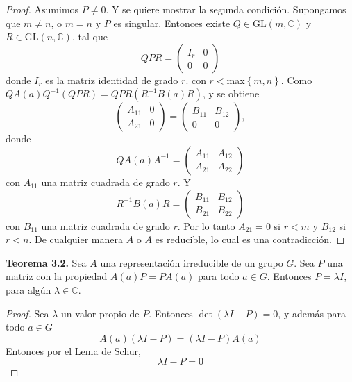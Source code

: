 \documentclass[12pt]{book}
\theoremstyle{definition}
\newcounter{in}
\begin{document}
\begin{proof}
Asumimos $P \neq 0$. Y se quiere mostrar la segunda
condición. Supongamos que $m \neq n$, o $m=n$ y $P$ es
singular. Entonces existe $Q \in \mathrm{GL}(m,\mathbb{C})$ y
$R \in \mathrm{GL}(n,\mathbb{C})$, tal que
\begin{equation*}
  QPR=
  \begin{pmatrix}
    I_{r} & 0 \\ 
    0 & 0
  \end{pmatrix} 
\end{equation*}
donde $I_{r}$ es la matriz identidad de grado $r$. con
$r<$max$\left\{ m,n \right\}$. Como
$QA(a)Q^{-1}(QPR) = QPR(R^{-1}B(a)R)$, y se obtiene
\begin{equation*}
  \begin{pmatrix}
    A_{11} & 0 \\ 
    A_{21} & 0
  \end{pmatrix}
  =
  \begin{pmatrix}
    B_{11} & B_{12} \\ 
    0 & 0
  \end{pmatrix},
\end{equation*}
donde
\begin{equation*}
  QA(a)A^{-1}=
  \begin{pmatrix}
    A_{11} & A_{12} \\ 
    A_{21} & A_{22}
  \end{pmatrix} 
\end{equation*}  
con $A_{11}$ una matriz cuadrada de grado $r$. Y
\begin{equation*}
  R^{-1}B(a)R=
  \begin{pmatrix}
    B_{11} & B_{12} \\ 
    B_{21} & B_{22}
  \end{pmatrix}
\end{equation*}
con $B_{11}$ una matriz cuadrada de grado $r$. Por lo tanto
$A_{21}=0$ si $r<m$ y $B_{12}$ si $r<n$. De cualquier manera
$A$ o $A$ es reducible, lo cual es una
contradicción.
\end{proof}

\textbf{Teorema 3.2.} Sea $A$ una representación irreducible de un
grupo $G$. Sea $P$ una matriz con la propiedad $A(a)P=PA(a)$ para todo
$a \in G$. Entonces $P=\lambda I$, para algún
$\lambda \in \mathbb{C}$.
\begin{proof}
  Sea $\lambda$ un valor propio de $P$. Entonces
  $\det(\lambda I - P)=0$, y además para todo $a \in G$
  \begin{equation*}
    A(a)(\lambda I - P)=(\lambda I - P)A(a)
  \end{equation*}
  Entonces por el Lema de Schur,
  \begin{equation*}
    \lambda I-P=0
  \end{equation*}
\end{proof}
\end{document}
